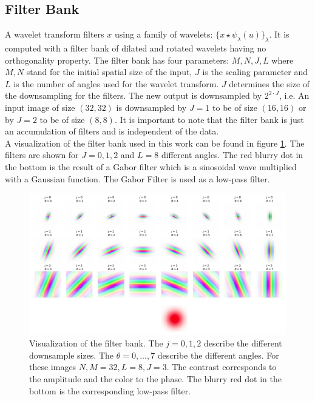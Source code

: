 \subsection{Filter Bank}
\label{subsec:filter_bank}

A wavelet transform filters $x$ using a family of wavelets: $\{x \star \psi_\lambda (u)\}_\lambda$. It is computed with a filter bank of dilated and rotated wavelets having no orthogonality property. The filter bank has four parameters: $M, N, J, L$ where $M,N$ stand for the initial spatial size of the input, $J$ is the scaling parameter and $L$ is the number of angles used for the wavelet transform. $J$ determines the size of the downsampling for the filters. The new output is downsampled by $2^{2\cdot J}$, i.e. An input image of size $(32, 32)$ is downsampled by $J=1$ to be of size $(16,16)$ or by $J=2$ to be of size $(8,8)$. It is important to note that the filter bank is just an accumulation of filters and is independent of the data. \\
A visualization of the filter bank used in this work can be found in figure \ref{fig:viz_filter_bank}. The filters are shown for $J=0,1,2$ and $L=8$ different angles. The red blurry dot in the bottom is the result of a Gabor filter which is a sinosoidal wave multiplied with a Gaussian function. The Gabor Filter is used as a low-pass filter. 


\begin{figure}[!htb]
	\centering
	\includegraphics[width=\textwidth]{images/filter_bank_vis2.png}
	\caption{Visualization of the filter bank. The $j=0,1,2$ describe the different downsample sizes. The $\theta=0,...,7$ describe the different angles. For these images $N,M=32, L=8, J=3$. The contrast corresponds to the amplitude and the color to the phase. The blurry red dot in the bottom is the corresponding low-pass filter.}
	\label{fig:viz_filter_bank}
\end{figure}


